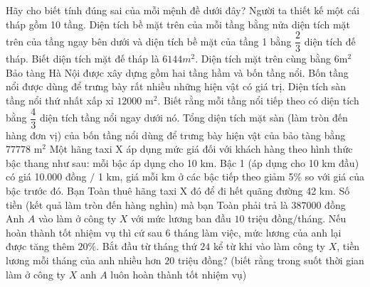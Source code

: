 \begin{ex}%
 Hãy cho  biết tính đúng sai của mỗi mệnh đề dưới đây?
 \choiceTF 
  {Người ta thiết kế một cái tháp gồm 10 tầng. Diện tích bề  mặt trên của mỗi tầng bằng nửa diện tích mặt trên của tầng ngay bên dưới và diện tích bề mặt của tầng 1 bằng $ \dfrac{2}{3} $ diện tích đế tháp. Biết diện tích mặt đế tháp là $ 6144 m^2 $. Diện tích mặt trên cùng bằng $ 6$m$^2 $}
  {\True Bảo tàng Hà Nội được xây dựng gồm hai tầng hầm  và
  bốn tầng nổi. Bốn tầng nổi được  dùng để trưng bày rất nhiều
  những hiện vật có giá trị. Diện tích sàn tầng nổi thứ  nhất xấp xỉ $12000$ m$^2$. Biết rằng mỗi tầng nổi tiếp theo có diện tích bằng $\dfrac{4}{3}$ diện tích tầng nổi ngay dưới nó. Tổng diện tích mặt sàn
  (làm tròn đến hàng đơn vị) của bốn  tầng nổi dùng để trưng bày hiện vật của bảo tàng bằng $77778$ m$^2$}
  {\True Một hãng taxi X áp dụng mức giá đối với khách hàng theo hình thức bậc thang như sau: mỗi bậc áp dụng cho 10 km. Bậc 1 (áp dụng cho 10 km đầu) có giá 10.000 đồng $/$ 1 km, giá mỗi km ở các bậc tiếp theo giảm 5\% so với giá của bậc trước đó. Bạn Toàn thuê hãng taxi X đó để đi hết quãng đường 42  km. Số tiền (kết quả làm tròn đến hàng nghìn) mà bạn Toàn phải trả là $387000$ đồng}
  {Anh $A$ vào làm ở công ty $X$ với mức lương ban đầu $10$ triệu đồng/tháng. Nếu hoàn thành tốt nhiệm vụ thì cứ  sau $6$ tháng làm việc, mức lương của anh lại được tăng thêm $20\%$. Bắt đầu từ tháng thứ $24$ kể từ khi vào làm công ty $X$, tiền lương mỗi tháng của anh nhiều hơn $20$ triệu đồng? (biết rằng trong suốt thời gian làm ở công ty $X$ anh $A$ luôn hoàn thành tốt nhiệm vụ)}
\end{ex}
